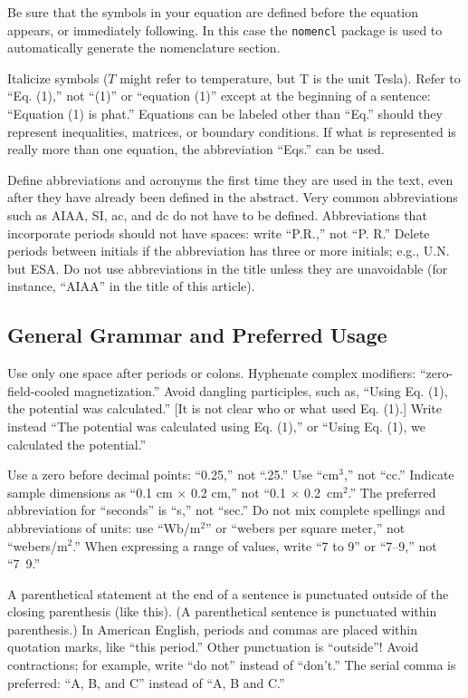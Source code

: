 \documentclass{aiaa-tc}%
\newcommand{\pkg}[1]{\texttt{#1}}
\begin{document}
Be sure that the symbols in your equation are defined before the
equation appears, or immediately following.
In this case the \pkg{nomencl} package is used to automatically generate
the nomenclature section.

Italicize symbols ($T$ might refer to temperature, but T is the unit
Tesla).
Refer to ``Eq. (1),'' not ``(1)'' or ``equation (1)'' except at the
beginning of a sentence: ``Equation (1) is phat.''
Equations can be labeled other than ``Eq.'' should they represent
inequalities, matrices, or boundary conditions.
If what is represented is really more than one equation, the
abbreviation ``Eqs.'' can be used.

Define abbreviations and acronyms the first time they are used in the
text, even after they have already been defined in the abstract.
Very common abbreviations such as AIAA, SI, ac, and dc do not have to be
defined.
Abbreviations that incorporate periods should not have spaces: write
``P.R.,'' not ``P. R.''
Delete periods between initials if the abbreviation has three or more
initials; e.g., U.N. but ESA.\@
Do not use abbreviations in the title unless they are unavoidable (for
instance, ``AIAA'' in the title of this article).

\subsection{General Grammar and Preferred Usage}

Use only one space after periods or colons. Hyphenate complex
modifiers: ``zero-field-cooled magnetization.''
Avoid dangling participles, such as, ``Using Eq. (1), the potential was
calculated.''
[It is not clear who or what used Eq. (1).]
Write instead ``The potential was calculated using Eq. (1),'' or ``Using
Eq. (1), we calculated the potential.''

Use a zero before decimal points: ``0.25,'' not ``.25.''
Use ``cm$^3$,'' not ``cc.''
Indicate sample dimensions as ``0.1 cm $\times$ 0.2 cm,'' not ``0.1
$\times$ 0.2~cm$^2$.''
The preferred abbreviation for ``seconds'' is ``s,'' not ``sec.''
Do not mix complete spellings and abbreviations of units: use
``Wb/m$^2$'' or ``webers per square meter,'' not ``webers/m$^2$.''
When expressing a range of values, write ``7 to 9'' or ``7--9,'' not
``7~9.''

A parenthetical statement at the end of a sentence is punctuated
outside of the closing parenthesis (like this).
(A parenthetical sentence is punctuated within parenthesis.)
In American English, periods and commas are placed within quotation
marks, like ``this period.''
Other punctuation is ``outside''! Avoid contractions; for example, write
``do not'' instead of ``don't.''
The serial comma is preferred: ``A, B, and C'' instead of ``A, B and C.''
\end{document}
